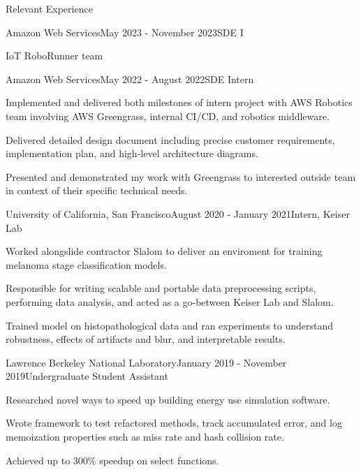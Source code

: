\documentclass{resume}
\begin{document}
\begin{rSection}{Relevant Experience}

\begin{rSubsection}{Amazon Web Services}{May 2023 - November 2023}{SDE I}{}
\item IoT RoboRunner team
\end{rSubsection}

\begin{rSubsection}{Amazon Web Services}{May 2022 - August 2022}{SDE Intern}{}
\item Implemented and delivered both milestones of intern project with AWS Robotics team involving AWS Greengrass, internal CI/CD, and robotics middleware.
\item Delivered detailed design document including precise customer requirements, implementation plan, and high-level architecture diagrams.
\item Presented and demonstrated my work with Greengrass to interested outside team in context of their specific technical needs.
\end{rSubsection}

\begin{rSubsection}{University of California, San Francisco}{August 2020 - January 2021}{Intern, Keiser Lab}{}
\item Worked alongslide contractor Slalom to deliver an enviroment for training melanoma stage classification models. 
\item Responsible for writing scalable and portable data preprocessing scripts, performing data analysis, and acted as a go-between Keiser Lab and Slalom.
\item Trained model on histopathological data and ran experiments to understand robustness, effects of artifacts and blur, and interpretable results.
\end{rSubsection}

\begin{rSubsection}{Lawrence Berkeley National Laboratory}{January 2019 - November 2019}{Undergraduate Student Assistant}{}
\item Researched novel ways to speed up building energy use simulation software. 
\item Wrote framework 
to test refactored methods, track accumulated
error, and log memoization properties such as miss rate and hash collision rate. 
\item Achieved up to 300\% speedup on select functions. 
\end{rSubsection}



\end{rSection}
\end{document}
